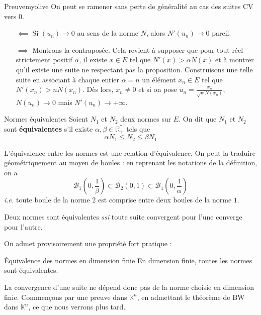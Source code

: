     \begin{demo}{Preuve}{myolive}
        On peut se ramener sans perte de généralité au cas des suites CV vers $0$. 
        \begin{itemize}
            \item[$\impliedby$] Si $(u_n) \to 0$ au sens de la norme $N$, alors $N'(u_n) \to 0$ pareil.
            \item[$\implies$] Montrons la contraposée. Cela revient à supposer que pour tout réel strictement positif $\alpha$, il existe $x \in E$ tel que $N'(x) > \alpha N(x)$ et à montrer qu’il existe une suite ne respectant pas la proposition. Construisons une telle suite en associant à chaque entier $\alpha = n$ un élément $x_n \in E$ tel que $N'(x_n) > n N(x_n)$. Dès lors, $x_n \neq 0$ et si on pose $u_n = \frac{x_n}{\sqrt{n} N(x_n)}$, $N(u_n) \to 0$ mais $N'(u_n) \to +\infty$.
        \end{itemize}
    \end{demo}

    \begin{defi}{Normes équivalentes}{}
        Soient $N_1$ et $N_2$ deux normes sur $E$. On dit que $N_1$ et $N_2$ sont \textbf{équivalentes} s’il existe $\alpha, \beta \in \mathbb{R}_+^*$ tels que 
        \[ \alpha N_1 \leq N_2 \leq \beta N_1 \]   
    \end{defi}

    L’équivalence entre les normes est une relation d’équivalence. On peut la traduire géométriquement au moyen de boules : en reprenant les notations de la définition, on a 
    \[ \mathcal{B}_1(0,\frac{1}{\beta}) \subset \mathcal{B}_2(0,1) \subset \mathcal{B}_1(0,\frac{1}{\alpha}) \]  
    \textit{i.e.} toute boule de la norme $2$ est comprise entre deux boules de la norme $1$. 

    \begin{prop}{}{}
        Deux normes sont équivalentes \textit{ssi} toute suite convergent pour l’une converge pour l’autre.
    \end{prop}

    On admet provisoirement une propriété fort pratique :

    \begin{theo}{Équivalence des normes en dimension finie}{}
        En dimension finie, toutes les normes sont équivalentes.
    \end{theo}

    La convergence d’une suite ne dépend donc pas de la norme choisie en dimension finie. Commençons par une preuve dans $\mathbb{K}^n$, en admettant le théorème de BW dans $\mathbb{K}^n$, ce que nous verrons plus tard.

